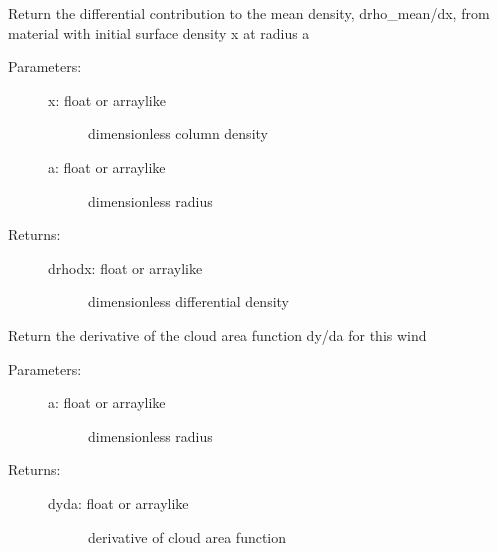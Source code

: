 \documentclass[letterpaper,10pt,english]{sphinxmanual}
\begin{document}
\begin{fulllineitems}
\begin{fulllineitems}
\end{fulllineitems}


\begin{fulllineitems}
\label{fulldoc:despotic.winds.pwind.drhodx}
Return the differential contribution to the mean density,
drho\_mean/dx, from material with initial surface density x at
radius a
\begin{description}
\item[{Parameters:}] \leavevmode\begin{description}
\item[{x: float or arraylike}] \leavevmode
dimensionless column density

\item[{a: float or arraylike}] \leavevmode
dimensionless radius

\end{description}

\item[{Returns:}] \leavevmode\begin{description}
\item[{drhodx: float or arraylike}] \leavevmode
dimensionless differential density

\end{description}

\end{description}

\end{fulllineitems}


\begin{fulllineitems}
\label{fulldoc:despotic.winds.pwind.dyda}
Return the derivative of the cloud area function dy/da for
this wind
\begin{description}
\item[{Parameters:}] \leavevmode\begin{description}
\item[{a: float or arraylike}] \leavevmode
dimensionless radius

\end{description}

\item[{Returns:}] \leavevmode\begin{description}
\item[{dyda: float or arraylike}] \leavevmode
derivative of cloud area function


\end{description}
\end{description}
\end{fulllineitems}
\end{fulllineitems}
\end{document}
